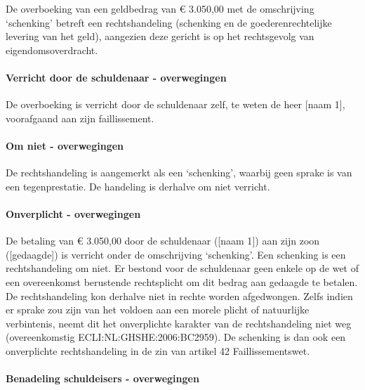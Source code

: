 \documentclass[
  dutch,
  a4paper,
]{article}
\begin{document}
De overboeking van een geldbedrag van € 3.050,00 met de omschrijving `schenking' betreft een rechtshandeling (schenking en de goederenrechtelijke levering van het geld), aangezien deze gericht is op het rechtsgevolg van eigendomsoverdracht.

\paragraph{Verricht door de schuldenaar - overwegingen}\label{verricht-door-de-schuldenaar---overwegingen-35}

De overboeking is verricht door de schuldenaar zelf, te weten de heer {[}naam 1{]}, voorafgaand aan zijn faillissement.

\paragraph{Om niet - overwegingen}\label{om-niet---overwegingen-35}

De rechtshandeling is aangemerkt als een `schenking', waarbij geen sprake is van een tegenprestatie. De handeling is derhalve om niet verricht.

\paragraph{Onverplicht - overwegingen}\label{onverplicht---overwegingen-35}

De betaling van € 3.050,00 door de schuldenaar ({[}naam 1{]}) aan zijn zoon ({[}gedaagde{]}) is verricht onder de omschrijving `schenking'. Een schenking is een rechtshandeling om niet. Er bestond voor de schuldenaar geen enkele op de wet of een overeenkomst berustende rechtsplicht om dit bedrag aan gedaagde te betalen. De rechtshandeling kon derhalve niet in rechte worden afgedwongen. Zelfs indien er sprake zou zijn van het voldoen aan een morele plicht of natuurlijke verbintenis, neemt dit het onverplichte karakter van de rechtshandeling niet weg (overeenkomstig ECLI:NL:GHSHE:2006:BC2959). De schenking is dan ook een onverplichte rechtshandeling in de zin van artikel 42 Faillissementswet.

\paragraph{Benadeling schuldeisers - overwegingen}\label{benadeling-schuldeisers---overwegingen-35}
\end{document}
